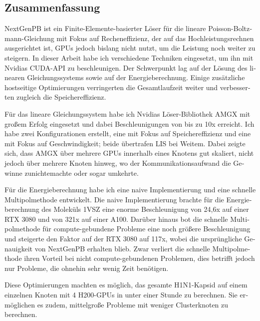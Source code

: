 \begin{otherlanguage}{ngerman}

\chapter*{Zusammenfassung}

NextGenPB ist ein Finite-Elemente-basierter Löser für die lineare Poisson-Boltzmann-Gleichung mit Fokus auf Recheneffizienz, der auf das Hochleistungsrechnen ausgerichtet ist, GPUs jedoch bislang nicht nutzt, um die Leistung noch weiter zu steigern.
In dieser Arbeit habe ich verschiedene Techniken eingesetzt, um ihn mit Nvidias CUDA-API zu beschleunigen.
Der Schwerpunkt lag auf der Lösung des linearen Gleichungssystems sowie auf der Energieberechnung.
Einige zusätzliche hostseitige Optimierungen verringerten die Gesamtlaufzeit weiter und verbesserten zugleich die Speichereffizienz.

Für das lineare Gleichungssystem habe ich Nvidias Löser-Bibliothek AMGX mit großem Erfolg eingesetzt und dabei Beschleunigungen von bis zu 10x erreicht.
Ich habe zwei Konfigurationen erstellt, eine mit Fokus auf Speichereffizienz und eine mit Fokus auf Geschwindigkeit; beide übertrafen LIS bei Weitem.
Dabei zeigte sich, dass AMGX über mehrere GPUs innerhalb eines Knotens gut skaliert, nicht jedoch über mehrere Knoten hinweg, wo der Kommunikationsaufwand die Gewinne zunichtemachte oder sogar umkehrte.

Für die Energieberechnung habe ich eine naive Implementierung und eine schnelle Multipolmethode entwickelt.
Die naive Implementierung brachte für die Energieberechnung des Moleküls 1VSZ eine enorme Beschleunigung von 24,6x auf einer RTX 3080 und von 321x auf einer A100.
Darüber hinaus bot die schnelle Multipolmethode für compute-gebundene Probleme eine noch größere Beschleunigung und steigerte den Faktor auf der RTX 3080 auf 117x, wobei die ursprüngliche Genauigkeit von NextGenPB erhalten blieb.
Zwar verliert die schnelle Multipolmethode ihren Vorteil bei nicht compute-gebundenen Problemen, dies betrifft jedoch nur Probleme, die ohnehin sehr wenig Zeit benötigen.

Diese Optimierungen machten es möglich, das gesamte H1N1-Kapsid auf einem einzelnen Knoten mit 4 H200-GPUs in unter einer Stunde zu berechnen.
Sie ermöglichen es zudem, mittelgroße Probleme mit weniger Clusterknoten zu berechnen.

\end{otherlanguage}
